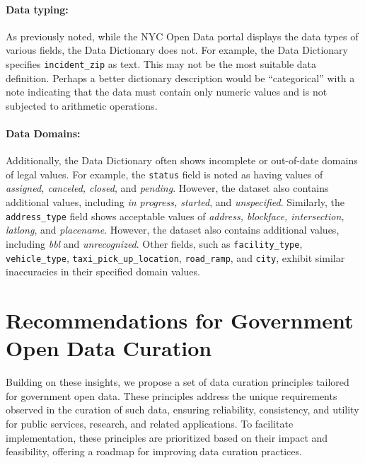 \documentclass[linenumber]{jdsart}
\begin{document}
\paragraph{Data typing:} As previously noted, while the NYC Open Data 
portal displays the data types of various fields, the 
Data Dictionary does not. For example, the Data Dictionary 
specifies \texttt{incident\_zip} as text. This may 
not be the most suitable data definition. Perhaps a better 
dictionary description would be ``categorical'' with a note 
indicating that the data must contain only numeric values 
and is not subjected to arithmetic operations.

\paragraph{Data Domains:} Additionally, the Data Dictionary often 
shows incomplete or out-of-date
domains of legal values. For example, the \texttt{status} field is noted as 
having values of \textit{assigned, canceled, 
closed}, and \textit{pending}. However, the dataset also contains 
additional values, including \textit{in progress, started},
and \textit{unspecified}. Similarly,
the \texttt{address\_type} field shows acceptable values 
of \textit{address, blockface, intersection, latlong}, 
and \textit{placename}. However, the dataset also 
contains additional values, including \textit{bbl} and \textit{unrecognized}.
Other fields, such as \texttt{facility\_type}, \texttt{vehicle\_type}, 
\texttt{taxi\_pick\_up\_location}, \texttt{road\_ramp}, and \texttt{city}, 
exhibit similar inaccuracies in their specified domain values.


\section{Recommendations for Government Open Data Curation}
\label{sec:recommendations}
Building on these insights, we propose a set of 
data curation principles tailored for government 
open data. These principles address the unique requirements 
observed in the curation of such data, ensuring reliability, 
consistency, and utility for public services, research, and 
related applications. To facilitate implementation, these principles 
are prioritized based on their impact and feasibility, offering a 
roadmap for improving data curation practices.
\end{document}
